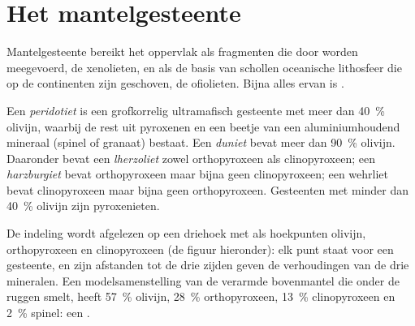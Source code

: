 \section{Het mantelgesteente}\label{sec:b2:mantle-melting:rock}

Mantelgesteente bereikt het oppervlak als fragmenten die door  worden meegevoerd, de
xenolieten, en als de basis van schollen oceanische lithosfeer die op de
continenten zijn geschoven, de ofiolieten. Bijna alles ervan is .

\begin{definition}\label{def:b2:mantle-melting:peridotites}
Een \emph{peridotiet} is een grofkorrelig ultramafisch gesteente
met meer dan \qty{40}{\percent} olivijn, waarbij de rest uit pyroxenen en een
beetje van een aluminiumhoudend mineraal (spinel of granaat) bestaat. Een
\emph{duniet} bevat meer dan \qty{90}{\percent} olivijn. Daaronder
bevat een \emph{lherzoliet} zowel orthopyroxeen als
clinopyroxeen; een \emph{harzburgiet} bevat orthopyroxeen maar
bijna geen clinopyroxeen; een wehrliet bevat clinopyroxeen maar bijna geen
orthopyroxeen. Gesteenten met minder dan \qty{40}{\percent} olivijn zijn pyroxenieten.
\end{definition}

De indeling wordt afgelezen op een driehoek met als hoekpunten olivijn,
orthopyroxeen en clinopyroxeen (de figuur hieronder): elk punt staat voor een gesteente,
en zijn afstanden tot de drie zijden geven de verhoudingen van de drie
mineralen. Een modelsamenstelling van de verarmde bovenmantel die onder
de ruggen smelt, heeft \qty{57}{\percent} olivijn,
\qty{28}{\percent} orthopyroxeen, \qty{13}{\percent} clinopyroxeen en
\qty{2}{\percent} spinel: een .

